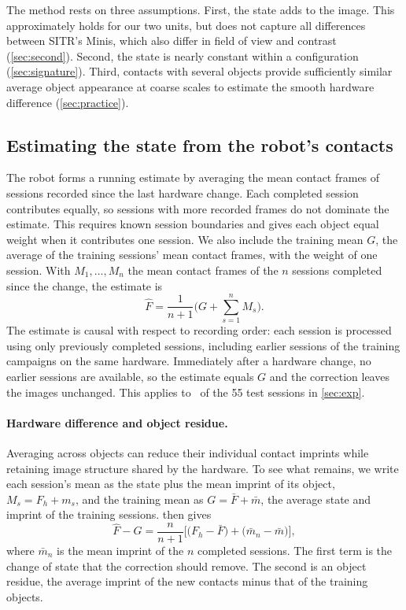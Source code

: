 The method rests on three assumptions. First, the state adds to the image. This approximately holds for our two units, but does not capture all differences between SITR's Minis, which also differ in field of view and contrast (\cref{sec:second}). Second, the state is nearly constant within a configuration (\cref{sec:signature}). Third, contacts with several objects provide sufficiently similar average object appearance at coarse scales to estimate the smooth hardware difference (\cref{sec:practice}).

\subsection{Estimating the state from the robot's contacts}
\label{sec:estimate}
The robot forms a running estimate by averaging the mean contact frames of sessions recorded since the last hardware change. Each completed session contributes equally, so sessions with more recorded frames do not dominate the estimate. This requires known session boundaries and gives each object equal weight when it contributes one session. We also include the training mean $G$, the average of the training sessions' mean contact frames, with the weight of one session. With $M_1, \dots, M_n$ the mean contact frames of the $n$ sessions completed since the change, the estimate is
\begin{equation}
\hat F = \frac{1}{n+1}\Big(G + \sum_{s=1}^{n} M_s\Big).
\label{eq:estimate}
\end{equation}
The estimate is causal with respect to recording order: each session is processed using only previously completed sessions, including earlier sessions of the training campaigns on the same hardware. Immediately after a hardware change, no earlier sessions are available, so the estimate equals $G$ and the correction leaves the images unchanged. This applies to \XpFirstN\ of the 55 test sessions in \cref{sec:exp}.

\paragraph{Hardware difference and object residue.}
Averaging across objects can reduce their individual contact imprints while retaining image structure shared by the hardware. To see what remains, we write each session's mean as the state plus the mean imprint of its object, $M_s = F_h + m_s$, and the training mean as $G = \bar F + \bar m$, the average state and imprint of the training sessions.  then gives
\begin{equation}
\hat F - G = \frac{n}{n+1}\Big[\big(F_h - \bar F\big) + \big(\bar m_n - \bar m\big)\Big],
\label{eq:residue}
\end{equation}
where $\bar m_n$ is the mean imprint of the $n$ completed sessions. The first term is the change of state that the correction should remove. The second is an object residue, the average imprint of the new contacts minus that of the training objects.

